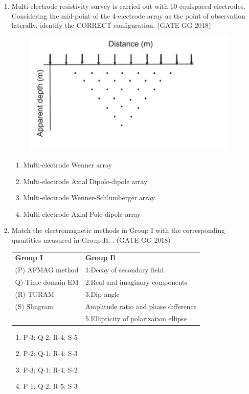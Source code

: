 \documentclass[journal]{IEEEtran}
\begin{document}
\begin{enumerate}[start=1]
\item Multi-electrode resistivity survey is carried out with $10$ equispaced electrodes.  Considering the mid-point of the $4$-electrode array as the point of observation laterally,  
identify the CORRECT configuration.
\hspace*{15.7cm}(GATE GG 2018)
\begin{figure}[H]
        \centering
        \includegraphics[width=0.5\columnwidth]{figs/09.png}
        \caption*{}
        \label{fig:q10}
    \end{figure}
\begin{multicols}{2}
\begin{enumerate}
\item Multi-electrode Wenner array
\item Multi-electrode Axial Dipole-dipole array
\item Multi-electrode Wenner-Schlumberger array
\item Multi-electrode Axial Pole-dipole array
\end{enumerate}
\end{multicols}

\item Match the electromagnetic methods in Group I with the corresponding quantities measured in Group II.  .
\hfill(GATE GG 2018)\\
\begin{tabular}{ l l }
\textbf{Group I} & \textbf{Group Il}\\
(P) AFMAG method & 1.Decay of secondary field\\
Q) Time domain EM & 2.Real and imaginary components\\
(R) TURAM & 3.Dip angle\\
(S) Slingram & Amplitude ratio and phase difference\\
 & 5.Ellipticity of polarization ellipse  
 \end{tabular}
 \begin{multicols}{2}
\begin{enumerate}
\item P-3; Q-2; R-4; S-5
\item P-2; Q-1; R-4; S-3
\item P-3; Q-1; R-4; S-2
\item P-1; Q-2; R-5; S-3
\end{enumerate}
\end{multicols}


\end{enumerate}
\end{document}
